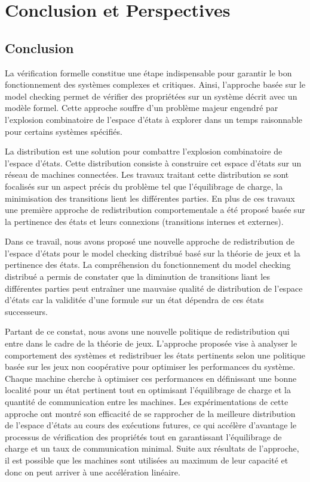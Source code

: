 \chapter*{Conclusion et Perspectives}

\section*{Conclusion}
La vérification formelle constitue une étape indispensable pour garantir le bon fonctionnement des systèmes complexes et critiques. Ainsi, l’approche basée sur le model checking permet de vérifier des propriétées sur un système décrit avec un modèle formel. Cette approche souffre d'un problème majeur engendré par l'explosion combinatoire de l'espace d'états à explorer  dans un temps raisonnable pour certains systèmes spécifiés.

La distribution est une solution pour combattre l'explosion combinatoire de l'espace d'états. Cette distribution consiste à construire cet espace d'états sur un réseau de machines connectées. Les travaux traitant cette distribution se sont focalisés sur un aspect précis du problème tel que l’équilibrage de charge, la minimisation des transitions lient les différentes parties. En plus de ces travaux une première approche de redistribution comportementale a été proposé basée sur la pertinence des états et leurs connexions (transitions internes et externes).

Dans ce travail, nous avons proposé une nouvelle approche de redistribution de l'espace d'états pour le model checking distribué basé sur la théorie de jeux et la pertinence des états. La compréhension du fonctionnement du model checking distribué a permis de constater que la diminution de transitions liant les différentes parties peut entraîner une mauvaise qualité de distribution de l'espace d'états car la validitée d'une formule sur un état dépendra de ces états successeurs.

Partant de ce constat, nous avons une nouvelle politique de redistribution qui entre dans le cadre de la théorie de jeux. L'approche proposée vise à analyser le comportement des systèmes et redistribuer les états pertinents selon une politique basée sur les jeux non coopérative pour optimiser les performances du système. Chaque machine cherche à optimiser ces performances en définissant une bonne localité pour un état pertinent tout en optimisant l’équilibrage de charge et la quantité de communication entre les machines. Les expérimentations de cette approche ont montré son efficacité de se rapprocher de la meilleure distribution de l’espace d’états au cours des exécutions futures, ce qui accélère d’avantage le processus de vérification des propriétés tout en garantissant l’équilibrage de  charge et un taux de communication minimal. Suite aux résultats de l'approche, il est possible que les machines sont utilisées au maximum de leur capacité et donc on peut arriver à une accélération linéaire.

